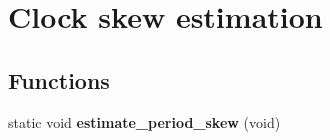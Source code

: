 \hypertarget{group__glossy-test-skew}{
\section{Clock skew estimation}
\label{group__glossy-test-skew}
}
\subsection*{Functions}
\begin{DoxyCompactItemize}
\item 
\hypertarget{group__glossy-test-skew_ga0bf2ebfd243be5dc3cea2083c55d3f75}{
static void {\bfseries estimate\_\-period\_\-skew} (void)}
\label{group__glossy-test-skew_ga0bf2ebfd243be5dc3cea2083c55d3f75}

\end{DoxyCompactItemize}
